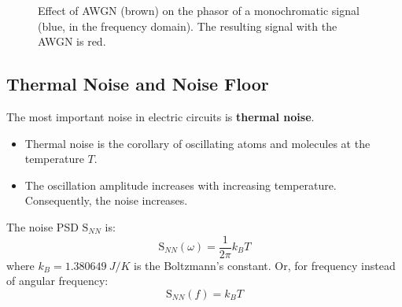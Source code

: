 \begin{refsection}
\begin{figure}[H]
	\centering
	\caption[Effect of AWGN on the phasor of a monochromatic signal (in the frequency domain)]{Effect of \ac{AWGN} (brown) on the phasor of a monochromatic signal (blue, in the frequency domain). The resulting signal with the \ac{AWGN} is red.}
\end{figure}

\subsection{Thermal Noise and Noise Floor}

The most important noise in electric circuits is  \textbf{thermal noise}.
\begin{itemize}
	\item Thermal noise is the corollary of oscillating atoms and molecules at the temperature $T$.
	\item The oscillation amplitude increases with increasing temperature. Consequently, the noise increases.
\end{itemize}

The noise \ac{PSD} $\mathrm{S}_{NN}$ is:
\begin{equation}
	\mathrm{S}_{NN}(\omega) = \frac{1}{2\pi} k_B T
\end{equation}
where $k_B = \SI{1.380649}{J/K}$ is the Boltzmann's constant. Or, for frequency instead of angular frequency:
\begin{equation}
	\mathrm{S}_{NN}(f) = k_B T
\end{equation}


\end{refsection}
